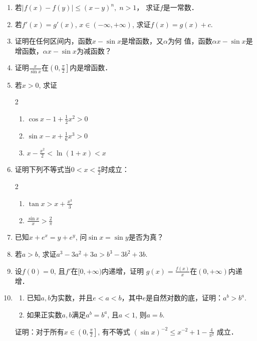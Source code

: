 \begin{ex}
\begin{enumerate}
    \item     若$|f(x)-f(y)|\le (x-y)^n,\; n>1$，
   求证$f$是一常数．
    \item 若$f'(x)=g'(x)$, $x\in(-\infty,+\infty)$, 求证$f(x)=g (x) +c$.
    \item 证明在任何区间内，函数$x-\sin x$是增函数，又$\alpha$为何
    值，函数$\alpha x-\sin x$是增函数，$\alpha x-\sin x$为减函数？
    \item 证明$\frac{x}{\sin x}$在$\left(0,\frac{\pi}{2}\right]$内是增函数．
    \item 若$x>0$, 求证
\begin{multicols}{2}
  \begin{enumerate}
\item  $\cos x-1+\frac{1}{2}x^2> 0$
\item $\sin x-x+\frac{1}{6}x^3> 0$
\item  $x-\frac{x^2}{2}<\ln (1+x)<x$
\end{enumerate}  
\end{multicols}

\item 证明下列不等式当$0<x<\frac{\pi}{2}$时成立：
\begin{multicols}{2}
    \begin{enumerate}
        \item $\tan x> x+\frac{x^3}{3}$
        \item $\frac{\sin x}{x}> \frac{2}{\pi}$
    \end{enumerate}
\end{multicols}

\item 已知$x+e^x=y+e^y$, 问$\sin x=\sin y$是否为真？
\item 若$a>b$, 求证$a^3-3a^2+3a>b^3-3b^2+3b$.
\item 设$f(0)=0$, 且$f'$在$[0,+\infty)$内递增，证明
$ g(x) =\frac{f (x)}{x}$在$(0,+\infty)$内递增．
\item 
\begin{enumerate}
    \item 已知$a,b$为实数，并且$e<a<b$，其中$e$是自然对数的底，证明：$a^b>b^a$.
    \item 如果正实数$a,b$满足$a^b=b^a$, 且$a<1$, 则$a=b$.
\end{enumerate}

\staritem 证明：对于所有$x\in\left(0,\frac{\pi}{2}\right]$, 有不等式
$(\sin x)^{-2}\le x^{-2}+1-\frac{4}{\pi^2}$
成立．
\end{enumerate}
\end{ex}


